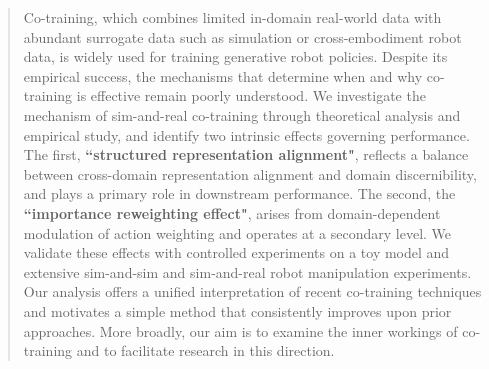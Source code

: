 \begin{abstract}
    Co-training, which combines limited in-domain real-world data with abundant surrogate data such as simulation or cross-embodiment robot data, is widely used for training generative robot policies. Despite its empirical success, the mechanisms that determine when and why co-training is effective remain poorly understood.
    We investigate the mechanism of sim-and-real co-training through theoretical analysis and empirical study, and identify two intrinsic effects governing performance. The first, \textbf{``structured representation alignment"}, reflects a balance between cross-domain representation alignment and domain discernibility, and plays a primary role in downstream performance. The second, the \textbf{``importance reweighting effect"}, arises from domain-dependent modulation of action weighting and operates at a secondary level.
    We validate these effects with controlled experiments on a toy model and extensive sim-and-sim and sim-and-real robot manipulation experiments. Our analysis offers a unified interpretation of recent co-training techniques and motivates a simple method that consistently improves upon prior approaches.
    More broadly, our aim is to examine the inner workings of co-training and to facilitate research in this direction.
\end{abstract}
\vspace{-1em}